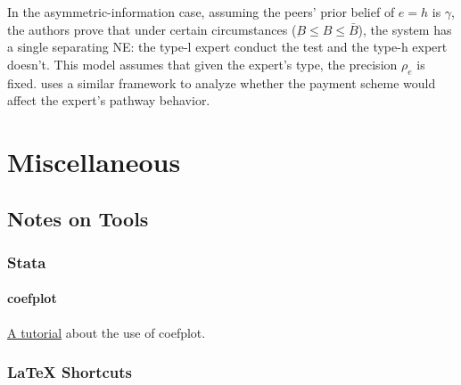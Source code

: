 \documentclass[10pt]{report}
\begin{document}
In the asymmetric-information case, assuming the peers' prior belief of $e=h$ is $\gamma$, the authors prove that under certain circumstances ($\underbar{B}\le B\le\bar{B}$), the system has a single separating NE: the type-l expert conduct the test and the type-h expert doesn't. 
This model assumes that given the expert's type, the precision $\rho_e$ is fixed.  
\cite{adida2023impact} uses a similar framework to analyze whether the payment scheme would affect the expert's pathway behavior.

\clearpage
\chapter{Miscellaneous} \label{chap:miscellaneous}

\section{Notes on Tools} \label{sec:notestools}

\subsection{Stata}

\subsubsection{coefplot}
\href{https://repec.sowi.unibe.ch/stata/coefplot/getting-started.html}{A tutorial} about the use of coefplot.

\subsection{LaTeX Shortcuts}
\end{document}
